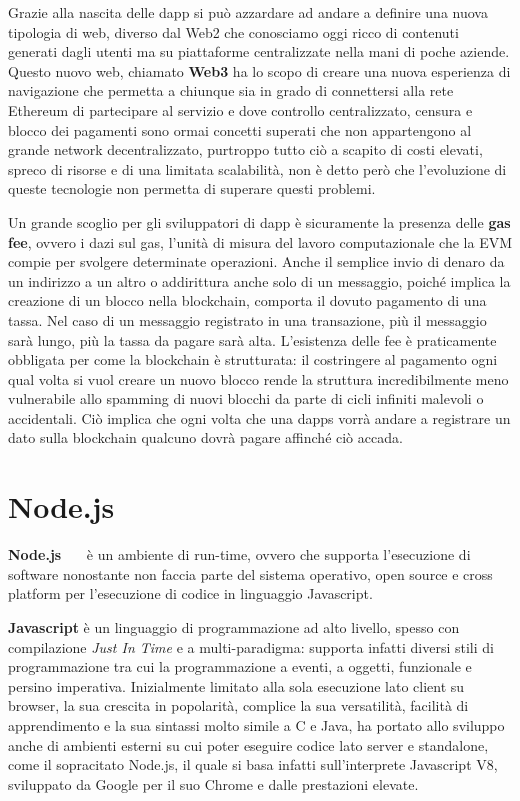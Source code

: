 Grazie alla nascita delle dapp si può azzardare ad andare a definire una nuova
tipologia di web, diverso dal Web2 che conosciamo oggi ricco di contenuti generati
dagli utenti ma su piattaforme centralizzate nella mani di poche aziende.
Questo nuovo web, chiamato \textbf{Web3} ha lo scopo di creare una nuova
esperienza di navigazione che permetta a chiunque sia in grado di connettersi
alla rete Ethereum di partecipare al servizio e dove controllo centralizzato,
censura e blocco dei pagamenti sono ormai concetti superati che non appartengono
al grande network decentralizzato, purtroppo tutto ciò a scapito di costi elevati,
spreco di risorse e di una limitata scalabilità, non è detto però che l'evoluzione
di queste tecnologie non permetta di superare questi problemi.

Un grande scoglio per gli sviluppatori di dapp è sicuramente la presenza
delle \textbf{gas fee}, ovvero i dazi sul \textsf{gas}, l'unità di misura del
lavoro computazionale che la EVM compie per svolgere determinate operazioni.
Anche il semplice invio di denaro da un indirizzo a un altro o addirittura anche
solo di un messaggio, poiché implica la creazione di un blocco nella blockchain,
comporta il dovuto pagamento di una tassa. Nel caso di un messaggio registrato in
una transazione, più il messaggio sarà lungo, più la tassa da pagare sarà alta.
L'esistenza delle fee è praticamente obbligata per come la blockchain è strutturata:
il costringere al pagamento ogni qual volta si vuol creare un nuovo blocco rende
la struttura incredibilmente meno vulnerabile allo spamming di nuovi blocchi da
parte di cicli infiniti malevoli o accidentali.
Ciò implica che ogni volta che una dapps vorrà andare a registrare un dato sulla
blockchain qualcuno dovrà pagare affinché ciò accada. 

\section{Node.js}

\textbf{Node.js}~\cite{njs-1}~\cite{njs-2}~\cite{njs-3} è un ambiente di run-time, ovvero che supporta l'esecuzione di
software nonostante non faccia parte del sistema operativo, open source e cross
platform per l'esecuzione di codice in linguaggio Javascript.

\textbf{Javascript} è un linguaggio di programmazione ad alto livello,
spesso con compilazione \emph{Just In Time} e a multi-paradigma: supporta infatti diversi
stili di programmazione tra cui la programmazione a eventi, a oggetti,
funzionale e persino imperativa.
Inizialmente limitato alla sola esecuzione lato client su browser,
la sua crescita in popolarità, complice la sua versatilità, facilità
di apprendimento e la sua sintassi molto simile a C e Java, ha portato
allo sviluppo anche di ambienti esterni su cui poter eseguire codice lato server
e standalone, come il sopracitato Node.js, il quale si basa infatti sull'interprete
Javascript V8, sviluppato da Google per il suo Chrome e dalle prestazioni elevate.

